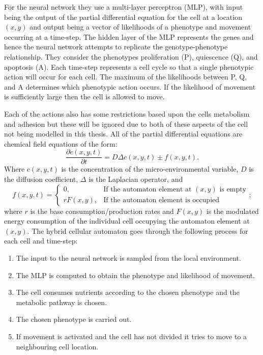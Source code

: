 \documentclass[\main/thesis.tex]{subfiles}
\begin{document}
For the neural network they use a multi-layer perceptron (MLP), with input being the output of the partial differential equation for the cell at a location $(x, y)$ and output being a vector of likelihoods of a phenotype and movement occurring at a time-step. The hidden layer of the MLP represents the genes and hence the neural network attempts to replicate the genotype-phenotype relationship. They consider the phenotypes proliferation (P), quiescence (Q), and apoptosis (A). Each time-step represents a cell cycle so that a single phenotypic action will occur for each cell. The maximum of the likelihoods between P, Q, and A determines which phenotypic action occurs. If the likelihood of movement is sufficiently large then the cell is allowed to move. 

Each of the actions also has some restrictions based upon the cells \newline
metabolism and adhesion but these will be ignored due to both of these aspects of the cell not being modelled in this thesis. All of the partial differential equations are chemical field equations of the form: 
$$
\frac{\partial c(x, y, t)}{\partial t} = D \Delta c(x, y, t) \pm f(x, y, t).
$$
Where $c(x, y, t)$ is the concentration of the micro-environmental variable, $D$ is the diffusion coefficient, $\Delta$ is the Laplacian operator, and 
$$f(x, y, t) = 
\begin{cases} 
  0, &\text{If the automaton element at } (x, y) \text{ is empty} \\ 
  rF(x, y), &\text{If the automaton element is occupied} 
\end{cases};$$
where $r$ is the base consumption/production rates and $F(x, y)$ is the modulated energy consumption of the individual cell occupying the automaton element at $(x, y)$. The hybrid cellular automaton goes through the following process for each cell and time-step:
\begin{enumerate}
  \item The input to the neural network is sampled from the local environment.
  \item The MLP is computed to obtain the phenotype and likelihood of movement.
  \item The cell consumes nutrients according to the chosen phenotype 
        and the metabolic pathway is chosen.
  \item The chosen phenotype is carried out.
  \item If movement is activated and the cell has not divided it tries to move to 
        a neighbouring cell location.
\end{enumerate}
\end{document}

